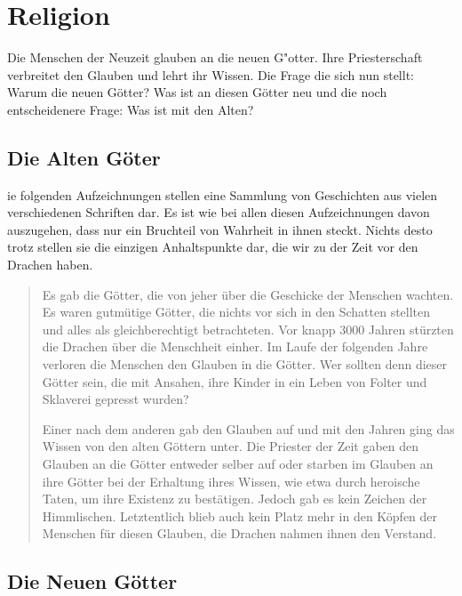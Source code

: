 \chapter{Religion}
\label{religion}
\par Die Menschen der Neuzeit glauben an die neuen G"otter.
Ihre Priesterschaft verbreitet den Glauben und lehrt ihr Wissen. Die
Frage die sich nun stellt: Warum die neuen Götter? Was ist an diesen
Götter neu und die noch entscheidenere Frage: Was ist mit den Alten?

\section{Die Alten Göter}
ie folgenden
Aufzeichnungen stellen eine Sammlung von Geschichten aus vielen
verschiedenen Schriften dar. Es ist wie bei allen diesen
Aufzeichnungen davon auszugehen, dass nur ein Bruchteil von Wahrheit
in ihnen steckt. Nichts desto trotz stellen sie die einzigen
Anhaltspunkte dar, die wir zu der Zeit vor den Drachen haben.

\begin{quotation}
\par Es gab die Götter, die von jeher über die Geschicke der
Menschen wachten. Es waren gutmütige Götter, die nichts vor sich in
den Schatten stellten und alles als gleichberechtigt betrachteten.
Vor knapp 3000 Jahren stürzten die Drachen über die Menschheit
einher. Im Laufe der folgenden Jahre verloren die Menschen den
Glauben in die Götter. Wer sollten denn dieser Götter sein, die mit
Ansahen, ihre Kinder in ein Leben von Folter und Sklaverei gepresst
wurden?
\par Einer nach dem anderen gab den Glauben auf und mit den Jahren
ging das Wissen von den alten Göttern unter. Die Priester der Zeit
gaben den Glauben an die Götter entweder selber auf oder starben im
Glauben an ihre Götter bei der Erhaltung ihres Wissen, wie etwa
durch heroische Taten, um ihre Existenz zu bestätigen. Jedoch gab es
kein Zeichen der Himmlischen. Letztentlich blieb auch kein Platz
mehr in den Köpfen der Menschen für diesen Glauben, die Drachen
nahmen ihnen den Verstand.
\end{quotation}



\section{Die Neuen Götter}
